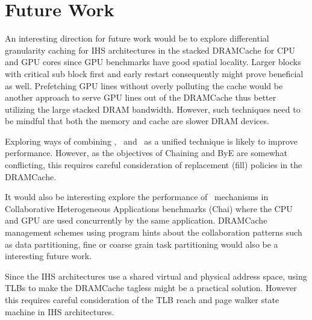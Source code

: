 \section{Future Work}
An interesting direction for future work would be to explore differential granularity caching for IHS architectures in the stacked DRAMCache for CPU and GPU cores since GPU benchmarks have good spatial locality. Larger blocks with critical sub block first and early restart \cite{dram-book} consequently might prove beneficial as well. Prefetching GPU lines without overly polluting the cache would be another approach to serve GPU lines out of the DRAMCache thus better utilizing the large stacked DRAM bandwidth. However, such techniques need to be mindful that both the memory and cache are slower DRAM devices. 
\par Exploring ways of combining \prioname, \chaining\ and \bypassname\ as a unified technique is likely to improve performance. However, as the objectives of Chaining and ByE are somewhat conflicting, this requires careful consideration of replacement (fill) policies in the DRAMCache.
\par It would also be interesting explore the performance of \cachename\ mechanisms in Collaborative Heterogeneous Applications benchmarks (Chai) \cite{chai} where the CPU and GPU are used concurrently by the same application. DRAMCache management schemes using program hints about the collaboration patterns such as data partitioning, fine or coarse grain task partitioning would also be a interesting future work.
\par Since the IHS architectures use a shared virtual and physical address space, using TLBs to make the DRAMCache tagless might be a practical solution. However this requires careful consideration of the TLB reach and page walker state machine in IHS architectures.

